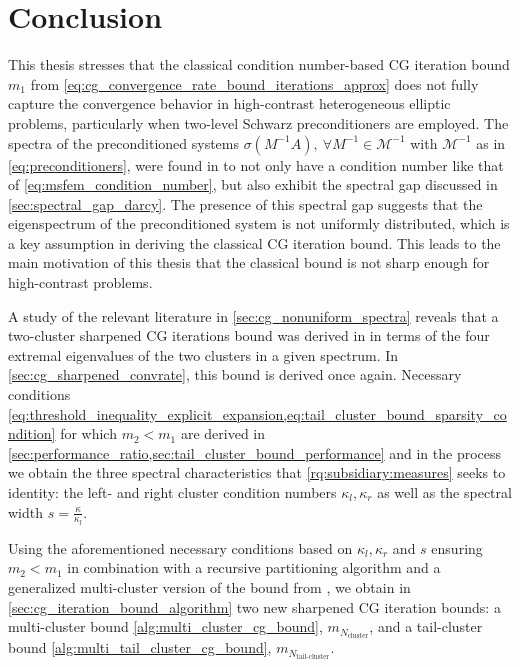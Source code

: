 \chapter{Conclusion}\label{ch:conclusion}
This thesis stresses that the classical condition number-based CG iteration bound $m_1$ from \cref{eq:cg_convergence_rate_bound_iterations_approx} does not fully capture the convergence behavior in high-contrast heterogeneous elliptic problems, particularly when two-level Schwarz preconditioners are employed. The spectra of the preconditioned systems $\sigma(M^{-1}A), \ \forall M^{-1}\in\mathcal{M}^{-1}$ with $\mathcal{M}^{-1}$ as in \cref{eq:preconditioners}, were found in \cite{ams_coarse_space_comp_study_Alves2024} to not only have a condition number like that of \cref{eq:msfem_condition_number}, but also exhibit the spectral gap discussed in \cref{sec:spectral_gap_darcy}. The presence of this spectral gap suggests that the eigenspectrum of the preconditioned system is not uniformly distributed, which is a key assumption in deriving the classical CG iteration bound. This leads to the main motivation of this thesis that the classical bound is not sharp enough for high-contrast problems.

A study of the relevant literature in \cref{sec:cg_nonuniform_spectra} reveals that a two-cluster sharpened CG iterations bound was derived in \cite[Section 4]{cg_sharpened_convrate_Axelsson1976} in terms of the four extremal eigenvalues of the two clusters in a given spectrum. In \cref{sec:cg_sharpened_convrate}, this bound is derived once again. Necessary conditions \cref{eq:threshold_inequality_explicit_expansion,eq:tail_cluster_bound_sparsity_condition} for which $m_2 < m_1$ are derived in \cref{sec:performance_ratio,sec:tail_cluster_bound_performance} and in the process we obtain the three spectral characteristics that \cref{rq:subsidiary:measures} seeks to identity: the left- and right cluster condition numbers $\kappa_l, \kappa_r$ as well as the spectral width $s = \frac{\kappa}{\kappa_l}$.

Using the aforementioned necessary conditions based on $\kappa_l,\kappa_r$ and $s$ ensuring $m_2 < m_1$ in combination with a recursive partitioning algorithm and a generalized multi-cluster version of the bound from \cite{cg_sharpened_convrate_Axelsson1976}, we obtain in \cref{sec:cg_iteration_bound_algorithm} two new sharpened CG iteration bounds: a multi-cluster bound \cref{alg:multi_cluster_cg_bound}, $m_{N_{\text{cluster}}}$, and a tail-cluster bound \cref{alg:multi_tail_cluster_cg_bound}, $m_{N_{\text{tail-cluster}}}$. 

